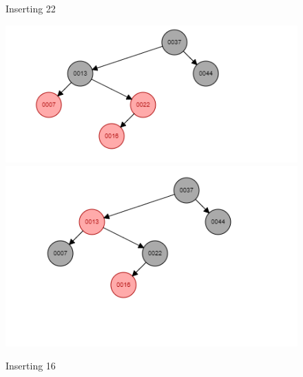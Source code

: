 \documentclass[a4paper,12pt]{article}
\begin{document}
{{\begin{figure} [h!]
\caption{Inserting 22}
\end{figure}
\begin{figure} [h!]
\includegraphics{1a6_1.png}
\includegraphics{1a6_2.png}
\caption{Inserting 16}
\end{figure} }}
\newpage 
\end{document}

